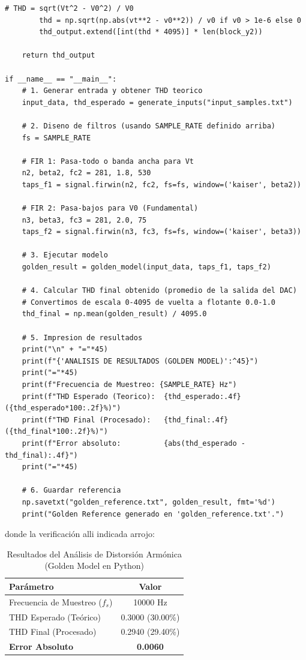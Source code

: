 \begin{lstlisting}[style=mystyle, caption={Código empleado para generar input \& golden.}, label={lst:filtro + ds}]
        # THD = sqrt(Vt^2 - V0^2) / V0
        thd = np.sqrt(np.abs(vt**2 - v0**2)) / v0 if v0 > 1e-6 else 0
        thd_output.extend([int(thd * 4095)] * len(block_y2))
        
    return thd_output

if __name__ == "__main__":
    # 1. Generar entrada y obtener THD teorico
    input_data, thd_esperado = generate_inputs("input_samples.txt")
    
    # 2. Diseno de filtros (usando SAMPLE_RATE definido arriba)
    fs = SAMPLE_RATE
    
    # FIR 1: Pasa-todo o banda ancha para Vt
    n2, beta2, fc2 = 281, 1.8, 530 
    taps_f1 = signal.firwin(n2, fc2, fs=fs, window=('kaiser', beta2))

    # FIR 2: Pasa-bajos para V0 (Fundamental)
    n3, beta3, fc3 = 281, 2.0, 75
    taps_f2 = signal.firwin(n3, fc3, fs=fs, window=('kaiser', beta3))
    
    # 3. Ejecutar modelo
    golden_result = golden_model(input_data, taps_f1, taps_f2)
    
    # 4. Calcular THD final obtenido (promedio de la salida del DAC)
    # Convertimos de escala 0-4095 de vuelta a flotante 0.0-1.0
    thd_final = np.mean(golden_result) / 4095.0
    
    # 5. Impresion de resultados
    print("\n" + "="*45)
    print(f"{'ANALISIS DE RESULTADOS (GOLDEN MODEL)':^45}")
    print("="*45)
    print(f"Frecuencia de Muestreo: {SAMPLE_RATE} Hz")
    print(f"THD Esperado (Teorico):  {thd_esperado:.4f} ({thd_esperado*100:.2f}%)")
    print(f"THD Final (Procesado):   {thd_final:.4f} ({thd_final*100:.2f}%)")
    print(f"Error absoluto:          {abs(thd_esperado - thd_final):.4f}")
    print("="*45)
    
    # 6. Guardar referencia
    np.savetxt("golden_reference.txt", golden_result, fmt='%d')
    print("Golden Reference generado en 'golden_reference.txt'.")
\end{lstlisting}

\noindent donde la verificación alli indicada arrojo:

\begin{table}[H]
\centering
\caption{Resultados del Análisis de Distorsión Armónica (Golden Model en Python)}
\begin{tabular}{lc}
\toprule
\textbf{Parámetro} & \textbf{Valor} \\
\midrule
Frecuencia de Muestreo ($f_s$) & 10000 Hz \\
THD Esperado (Teórico) & 0.3000 (30.00\%) \\
THD Final (Procesado) & 0.2940 (29.40\%) \\
\midrule
\rowcolor[gray]{0.9} \textbf{Error Absoluto} & \textbf{0.0060} \\
\bottomrule
\end{tabular}
\label{tab:analisis_golden_model}
\end{table}

